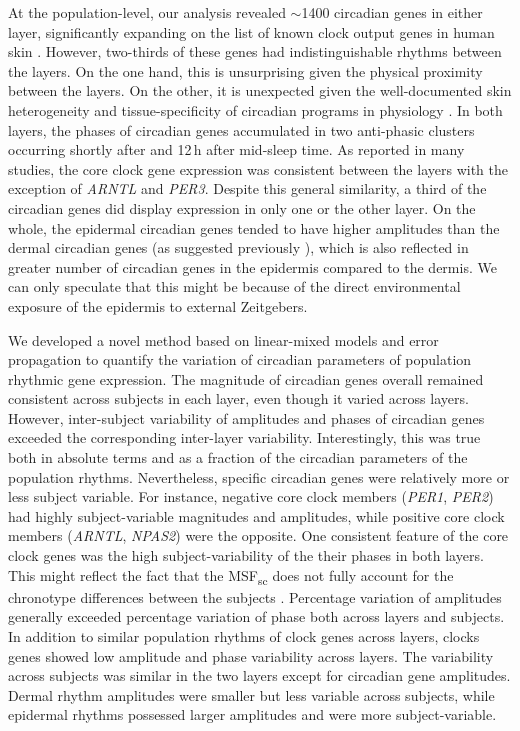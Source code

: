 At the population-level, our analysis revealed $\sim$1400 circadian genes in either layer, significantly expanding on the list of known clock output genes in human skin \cite{Wu2018, Wu2020}. However, two-thirds of these genes had indistinguishable rhythms between the layers. On the one hand, this is unsurprising given the physical proximity between the layers. On the other, it is unexpected given the well-documented skin heterogeneity and tissue-specificity of circadian programs in physiology \cite{Ruben2018}. In both layers, the phases of circadian genes accumulated in two anti-phasic clusters occurring shortly after and 12\,h after mid-sleep time. As reported in many studies, the core clock gene expression was consistent between the layers with the exception of \textit{ARNTL} and \textit{PER3}. Despite this general similarity, a third of the circadian genes did display expression in only one or the other layer. On the whole, the epidermal circadian genes tended to have higher amplitudes than the dermal circadian genes (as suggested previously \cite{Wu2020}), which is also reflected in greater number of circadian genes in the epidermis compared to the dermis. We can only speculate that this might be because of the direct environmental exposure of the epidermis to external Zeitgebers.

We developed a novel method based on linear-mixed models and error propagation to quantify the variation of circadian parameters of population rhythmic gene expression. The magnitude of circadian genes overall remained consistent across subjects in each layer, even though it varied across layers. However, inter-subject variability of amplitudes and phases of circadian genes exceeded the corresponding inter-layer variability. Interestingly, this was true both in absolute terms and as a fraction of the circadian parameters of the population rhythms. Nevertheless, specific circadian genes were relatively more or less subject variable. For instance, negative core clock members (\textit{PER1}, \textit{PER2}) had highly subject-variable magnitudes and amplitudes, while positive core clock members (\textit{ARNTL}, \textit{NPAS2}) were the opposite. One consistent feature of the core clock genes was the high subject-variability of the their phases in both layers. This might reflect the fact that the MSF\textsubscript{sc} does not fully account for the chronotype differences between the subjects . Percentage variation of amplitudes generally exceeded percentage variation of phase both across layers and subjects. In addition to similar population rhythms of clock genes across layers, clocks genes showed low amplitude and phase variability across layers. The variability across subjects was similar in the two layers except for circadian gene amplitudes. Dermal rhythm amplitudes were smaller but less variable across subjects, while epidermal rhythms possessed larger amplitudes and were more subject-variable.

